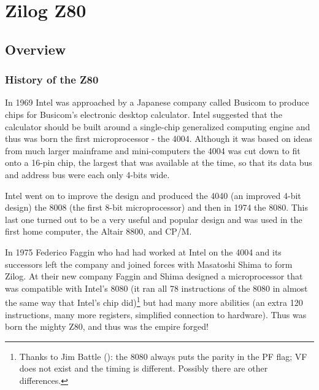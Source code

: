 \documentclass[12pt,twoside,openright,a4paper]{book}
\begin{document}
\pagebreak
\IntentionallyEmpty
\pagebreak


\chapter{Zilog Z80}


\minitoc

\pagebreak
\section{Overview}
\subsection{History of the Z80}

In 1969 Intel was approached by a Japanese company called Busicom to produce  chips for Busicom's electronic desktop calculator. Intel suggested that the calculator should be built around a single-chip generalized computing engine and thus was born the first microprocessor - the 4004. Although it was based on ideas from much larger mainframe and mini-computers the 4004 was cut down to fit onto a 16-pin chip, the largest that was available at the time, so that its data bus and address bus were each only 4-bits wide. 

Intel went on to improve the design and produced the 4040 (an improved 4-bit design) the 8008 (the first 8-bit microprocessor) and then in 1974 the 8080. This last one turned out to be a very useful and popular design and was used in the first home computer, the Altair 8800, and CP/M. 

In 1975 Federico Faggin who had had worked at Intel on the 4004 and its successors left the company and joined forces with Masatoshi Shima to form Zilog. At their new company Faggin and Shima designed a microprocessor that was compatible with Intel's 8080 (it ran all 78 instructions of the 8080 in almost the same way that Intel's chip did)\footnote{Thanks to Jim Battle (): the 8080 always puts the parity in the PF flag; VF does not exist and the timing is different. Possibly there are other differences.} but had many more abilities (an extra 120 instructions, many more registers, simplified connection to hardware). Thus was born the mighty Z80, and thus was the empire forged!
\end{document}
